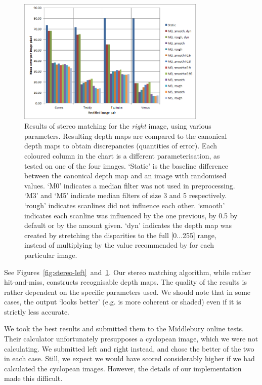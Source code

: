 \begin{figure}[h]
  \centering
  \includegraphics[width=0.8\textwidth]{Stereo-right-report}
  \caption[Results of stereo matching (left image)]{Results of stereo matching
    for the \emph{right} image, using various parameters. Resulting depth maps
    are compared to the canonical depth maps to obtain discrepancies (quantities
    of error). Each coloured column in the chart is a different
    parameterisation, as tested on one of the four images. `Static' is the
    baseline difference between the canonical depth map and an image with
    randomised values. `M0' indicates a median filter was not used in
    preprocessing. `M3' and `M5' indicate median filters of size 3 and 5
    respectively. `rough' indicates scanlines did not influence each other.
    `smooth' indicates each scanline was influenced by the one previous, by 0.5
    by default or by the amount given. `dyn' indicates the depth map was created
    by stretching the disparities to the full [0...255] range, instead of
    multiplying by the value recommended by \cite{middlebury} for each
    particular image.}
  \label{fig:stereo-right}
\end{figure}

See Figures~\ref{fig:stereo-left}~and~\ref{fig:stereo-right}. Our stereo matching
algorithm, while rather hit-and-miss, constructs recognisable depth maps. The
quality of the results is rather dependent on the specific parameters used. We
should note that in some cases, the output `looks better' (e.g. is more coherent
or shaded) even if it is strictly less accurate.

We took the best results and submitted them to the Middlebury online tests.
\cite{stereocorrespondence, middlebury} Their calculator unfortunately
presupposes a cyclopean image, which we were not calculating. We submitted left
and right instead, and chose the better of the two in each case. Still, we
expect we would have scored considerably higher if we had calculated the
cyclopean images. However, the details of our implementation made this
difficult.

